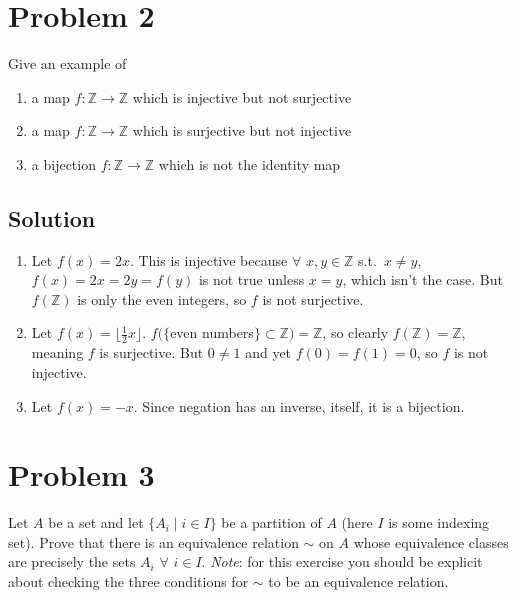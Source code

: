 \documentclass[fleqn]{article}
\begin{document}
    \pagebreak
        
    \section{Problem 2}
    Give an example of 
    \begin{enumerate}
        \item a map $f: \mathbb{Z} \to \mathbb{Z}$ which is injective but not surjective
        \item a map $f: \mathbb{Z} \to \mathbb{Z}$ which is surjective but not injective
        \item a bijection $f: \mathbb{Z} \to \mathbb{Z}$ which is not the identity map
    \end{enumerate}
        
        \subsection{Solution}
        \begin{enumerate}
            
            \item Let $f(x) = 2x$.  This is injective because $\forall$ $x, y \in \mathbb{Z}$ s.t.\ $x \neq y$, $f(x) = 2x = 2y = f(y)$ is not true unless $x = y$, which isn't the case.  But $f(\mathbb{Z})$ is only the even integers, so $f$ is not surjective.
            
            \item Let $f(x) = \lfloor \frac{1}{2} x \rfloor$.  $f(\{$even numbers$\} \subset \mathbb{Z}) = \mathbb{Z}$, so clearly $f(\mathbb{Z}) = \mathbb{Z}$, meaning $f$ is surjective.  But $0 \neq 1$ and yet $f(0) = f(1) = 0$, so $f$ is not injective.
            
            \item Let $f(x) = -x$.  Since negation has an inverse, itself, it is a bijection.
            
        \end{enumerate}
    
    \section{Problem 3}
    Let $A$ be a set and let $\{A_i \mid i \in I\}$ be a partition of $A$ (here $I$ is some indexing set).  Prove that there is an equivalence relation $\sim$ on $A$ whose equivalence classes are precisely the sets $A_i$ $\forall$ $i \in I$.  \textit{Note}: for this exercise you should be explicit about checking the three conditions for $\sim$ to be an equivalence relation.
        
\end{document}
